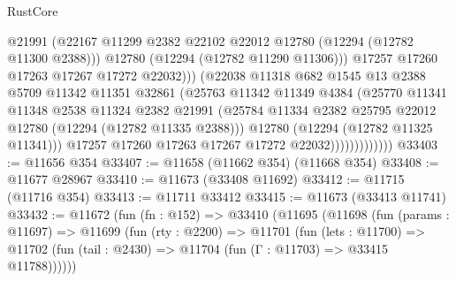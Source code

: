 \begin{lexlean}{RustCore}
\begin{coremodule}
                                  @21991
                                  (@22167
                                    @11299
                                    @2382
                                    @22102
                                    @22012
                                    @12780
                                    (@12294 (@12782 @11300 @2388)))
                                  @12780
                                  (@12294 (@12782 @11290 @11306)))
                                @17257
                                @17260
                                @17263
                                @17267
                                @17272
                                @22032)))
                          (@22038
                            @11318
                            @682
                            @1545
                            @13
                            @2388
                            @5709
                            @11342
                            @11351
                            @32861
                            (@25763
                              @11342
                              @11349
                              @4384
                              (@25770
                                @11341
                                @11348
                                @2538
                                @11324
                                @2382
                                @21991
                                (@25784
                                  @11334
                                  @2382
                                  @25795
                                  @22012
                                  @12780
                                  (@12294 (@12782 @11335 @2388)))
                                @12780
                                (@12294 (@12782 @11325 @11341)))
                              @17257
                              @17260
                              @17263
                              @17267
                              @17272
                              @22032)))))))))))))
@33403 := @11656 @354
@33407 := @11658 (@11662 @354) (@11668 @354)
@33408 := @11677 @28967
@33410 := @11673 (@33408 @11692)
@33412 := @11715 (@11716 @354)
@33413 := @11711 @33412
@33415 := @11673 (@33413 @11741)
@33432 := @11672
    (fun (fn : @152) =>
    @33410
      (@11695
        (@11698
          (fun (params : @11697) =>
          @11699
            (fun (rty : @2200) =>
            @11701
              (fun (lets : @11700) =>
              @11702 (fun (tail : @2430) => @11704 (fun (Γ : @11703) => @33415 @11788))))))

\end{coremodule}
\end{lexlean}
